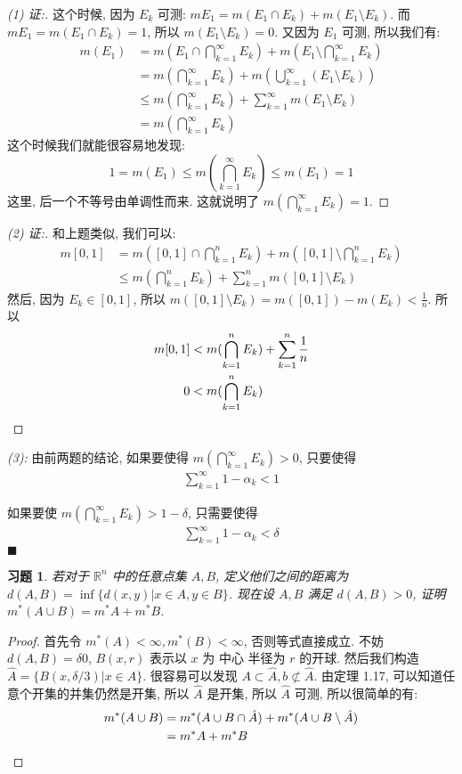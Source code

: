 \documentclass{article}
\newtheorem{exercise}{习题}
\newenvironment{solve}{{\flushleft\textit{解.}}}{\hfill $\blacksquare$}
\begin{document}
\begin{solve}
\begin{proof}[(1) 证:]
  这个时候, 因为 $E_k$ 可测: $mE_1 = m(E_1\cap E_k) + m(E_1\setminus E_k)$. 而 $mE_1 = m(E_1\cap E_k) = 1$, 所以 $m(E_1\setminus E_k) = 0$.
  又因为 $E_1$ 可测, 所以我们有:
  \begin{align*}
    m(E_1) &= m(E_1\cap \bigcap_{k=1}^\infty E_k) + m(E_1\setminus \bigcap_{k=1}^\infty E_k)\\
           &= m(\bigcap_{k=1}^\infty E_k) + m(\bigcup_{k=1}^\infty (E_1\setminus E_k)) \\
           &\leq m(\bigcap_{k=1}^\infty E_k) + \sum_{k=1}^\infty m(E_1\setminus E_k) \\
    &= m(\bigcap_{k=1}^\infty E_k)
  \end{align*}
  这个时候我们就能很容易地发现:
  \[1 = m(E_1) \leq m(\bigcap_{k=1}^\infty E_k) \leq m(E_1) = 1\]
  这里, 后一个不等号由单调性而来. 这就说明了 $m(\bigcap_{k=1}^\infty E_k) = 1$.
\end{proof}
\begin{proof}[(2) 证:]
  和上题类似, 我们可以:
  \begin{align*}
    m[0, 1] &= m([0, 1] \cap \bigcap_{k=1}^n E_k) + m([0, 1] \setminus \bigcap_{k=1}^n E_k) \\
    &\leq m(\bigcap_{k=1}^n E_k) + \sum_{k=1}^n m([0, 1] \setminus E_k)
  \end{align*}
  然后, 因为 $E_k \in [0, 1]$, 所以 $m([0, 1]\setminus E_k) = m([0, 1]) - m(E_k) < \frac{1}{n}$. 所以
  \begin{align*}
    m[0, 1] &< m(\bigcap_{k=1}^n E_k) + \sum_{k=1}^n \frac{1}{n} \\
    0 &< m(\bigcap_{k=1}^n E_k) \qedhere
  \end{align*}
\end{proof}
\emph{(3):} 由前两题的结论, 如果要使得 $m(\bigcap_{k=1}^\infty E_k) > 0$, 只要使得
\begin{align*}
  \sum_{k=1}^\infty 1 - \alpha_k   < 1
\end{align*}

如果要使 $m(\bigcap_{k=1}^\infty E_k) > 1 - \delta$, 只需要使得
\begin{align*}
  \sum_{k=1}^\infty 1 - \alpha_k  < \delta
\end{align*}
\end{solve}
\begin{exercise}
  若对于 $\mathbb{R}^n$ 中的任意点集 $A, B$, 定义他们之间的距离为 $d(A, B) = \inf\{d(x, y) | x\in A, y\in B\}$. 现在设 $A, B$ 满足 $d(A, B) > 0$, 证明 $m^*(A\cup B) = m^*A + m^*B$.
\end{exercise}
\begin{proof}
  首先令 $m^*(A) < \infty, m^*(B) < \infty$, 否则等式直接成立. 不妨 $d(A, B) = \delta  0$, $B(x, r)$ 表示以 $x$ 为 中心 半径为 $r$ 的开球. 然后我们构造 $\hat{A} = \{B(x, \delta/3) | x\in A\}$. 很容易可以发现 $A \subset \hat{A}, b\not\subset \hat{A}$. 由定理 1.17, 可以知道任意个开集的并集仍然是开集, 所以 $\hat{A}$ 是开集, 所以 $\hat{A}$ 可测, 所以很简单的有:
  \begin{align*}
    m^*(A\cup B) &= m^*(A\cup B\cap \hat{A}) + m^*(A\cup B\setminus \hat{A}) \\
    &= m^*A + m^*B \qedhere
  \end{align*}
\end{proof}
\end{document}

